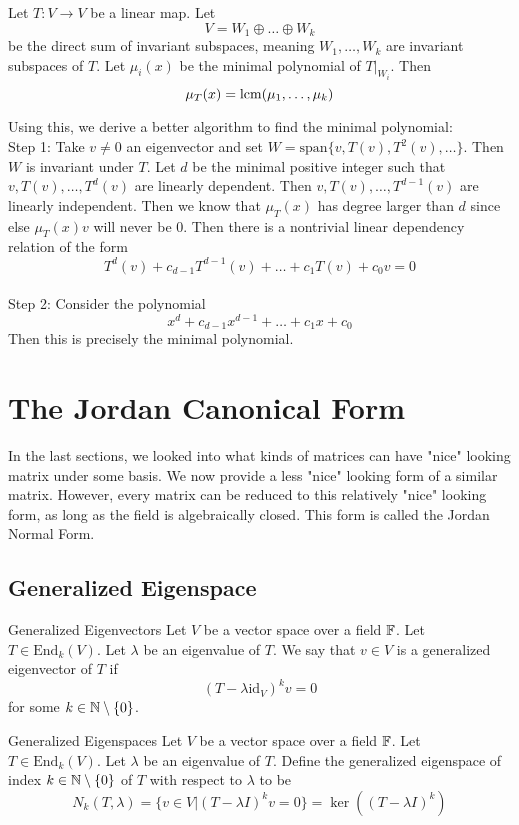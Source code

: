 \documentclass[a4paper]{article}
\begin{document}
\begin{lmm}{}{} Let $T:V\to V$ be a linear map. Let $$V=W_1\oplus\dots\oplus W_k$$ be the direct sum of invariant subspaces, meaning $W_1,\dots,W_k$ are invariant subspaces of $T$. Let $\mu_i(x)$ be the minimal polynomial of $T|_{W_i}$. Then $$\mu_T(x)=\operatorname{lcm}(\mu_1,\dots,\mu_k)$$
\end{lmm}

Using this, we derive a better algorithm to find the minimal polynomial: \\
Step 1: Take $v\neq 0$ an eigenvector and set $W=\text{span}\{v,T(v),T^2(v),\dots\}$. Then $W$ is invariant under $T$. Let $d$ be the minimal positive integer such that $v,T(v),\dots,T^d(v)$ are linearly dependent. Then $v,T(v),\dots,T^{d-1}(v)$ are linearly independent. Then we know that $\mu_T(x)$ has degree larger than $d$ since else $\mu_T(x)v$ will never be $0$. Then there is a nontrivial linear dependency relation of the form $$T^d(v)+c_{d-1}T^{d-1}(v)+\dots+c_1T(v)+c_0v=0$$\\
Step 2: Consider the polynomial $$x^d+c_{d-1}x^{d-1}+\dots+c_1x+c_0$$ Then this is precisely the minimal polynomial. 

\pagebreak
\section{The Jordan Canonical Form}
In the last sections, we looked into what kinds of matrices can have "nice" looking matrix under some basis. We now provide a less "nice" looking form of a similar matrix. However, every matrix can be reduced to this relatively "nice" looking form, as long as the field is algebraically closed. This form is called the Jordan Normal Form. 

\subsection{Generalized Eigenspace}
\begin{defn}{Generalized Eigenvectors}{} Let $V$ be a vector space over a field $\mathbb{F}$. Let $T\in\text{End}_k(V)$. Let $\lambda$ be an eigenvalue of $T$. We say that $v\in V$ is a generalized eigenvector of $T$ if $$(T-\lambda\text{id}_V)^kv=0$$ for some $k\in\mathbb{N}\setminus\{0\}$. 
\end{defn}

\begin{defn}{Generalized Eigenspaces}{} Let $V$ be a vector space over a field $\mathbb{F}$. Let $T\in\text{End}_k(V)$. Let $\lambda$ be an eigenvalue of $T$. Define the generalized eigenspace of index $k\in\mathbb{N}\setminus\{0\}$ of $T$ with respect to $\lambda$ to be $$N_k(T,\lambda)=\{v\in V|(T-\lambda I)^kv=0\}=\ker((T-\lambda I)^k)$$
\end{defn}
\end{document}
